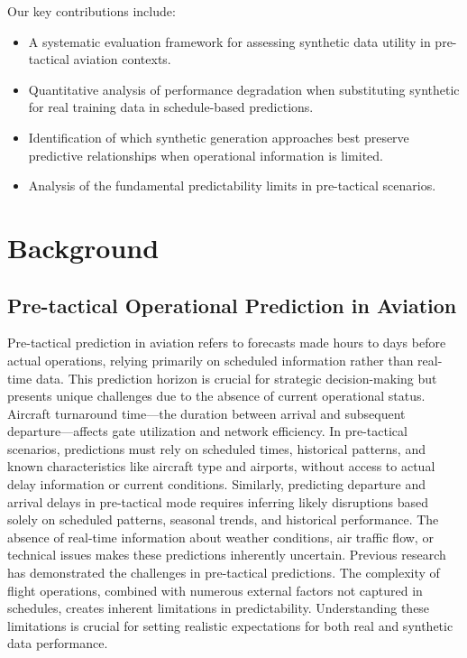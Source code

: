 \documentclass[conference]{IEEEtran}
\begin{document}
Our key contributions include:
\begin{itemize}
    \item A systematic evaluation framework for assessing synthetic data utility in pre-tactical aviation contexts.
    \item Quantitative analysis of performance degradation when substituting synthetic for real training data in schedule-based predictions.
    \item Identification of which synthetic generation approaches best preserve predictive relationships when operational information is limited.
    \item Analysis of the fundamental predictability limits in pre-tactical scenarios.
\end{itemize}




\section{Background }

\subsection{ Pre-tactical Operational Prediction in Aviation}
Pre-tactical prediction in aviation refers to forecasts made hours to days before actual operations, relying primarily on scheduled information rather than real-time data. This prediction horizon is crucial for strategic decision-making but presents unique challenges due to the absence of current operational status.
Aircraft turnaround time—the duration between arrival and subsequent departure—affects gate utilization and network efficiency. In pre-tactical scenarios, predictions must rely on scheduled times, historical patterns, and known characteristics like aircraft type and airports, without access to actual delay information or current conditions.
Similarly, predicting departure and arrival delays in pre-tactical mode requires inferring likely disruptions based solely on scheduled patterns, seasonal trends, and historical performance. The absence of real-time information about weather conditions, air traffic flow, or technical issues makes these predictions inherently uncertain.
Previous research has demonstrated the challenges in pre-tactical predictions. The complexity of flight operations, combined with numerous external factors not captured in schedules, creates inherent limitations in predictability. Understanding these limitations is crucial for setting realistic expectations for both real and synthetic data performance.
\end{document}
